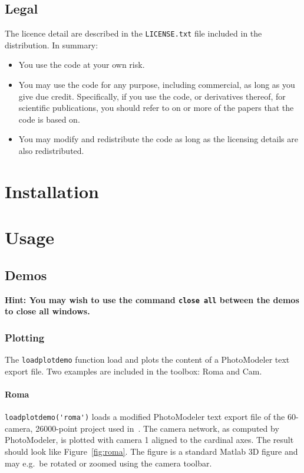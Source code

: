 \documentclass{article}
\begin{document}
\subsection{Legal}

The licence detail are described in the \texttt{LICENSE.txt} file
included in the distribution. In summary:
\begin{itemize}
\item You use the code at your own risk.
\item You may use the code for any purpose, including commercial, as
  long as you give due credit. Specifically, if you use the code, or
  derivatives thereof, for scientific publications, you should refer
  to on or more of the papers
  \citet{Borlin2013:Bundle,Borlin2013:Experiments,Borlin2014:Camera,Borlin2016:External}
  that the code is based on.
\item You may modify and redistribute the code as long as the
  licensing details are also redistributed.
\end{itemize}

\section{Installation}
\label{sec:install}
\label{step:dbatInit}

{\scriptsize

}

\section{Usage}

\subsection{Demos}
\label{sec:demos}

\textbf{Hint: You may wish to use the command \texttt{close all}
  between the demos to close all windows.}

\subsubsection{Plotting}
\label{sec:loadplotdemo}
\label{sec:loadroma}

The \verb+loadplotdemo+ function load and plots the content of a
PhotoModeler text export file. Two examples are included in the
toolbox: {\sc Roma} and {\sc Cam}.

\paragraph{\sc Roma}
\verb+loadplotdemo('roma')+ loads a modified PhotoModeler text export
file of the 60-camera, 26000-point project used
in~\citet{Borlin2013:Bundle}. The camera network, as computed by
PhotoModeler, is plotted with camera 1 aligned to the cardinal axes.
The result should look like Figure~\ref{fig:roma}. The figure is a
standard Matlab 3D figure and may e.g.\ be rotated or zoomed using the
camera toolbar.
\end{document}
